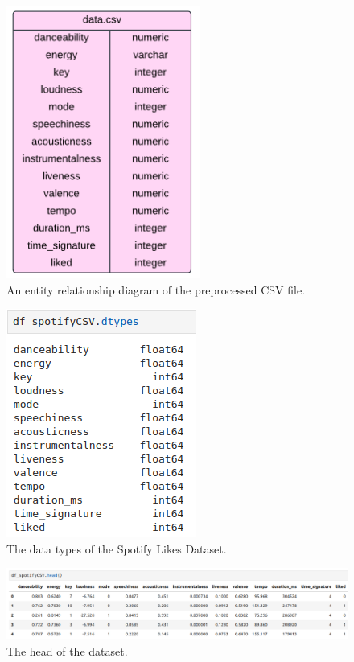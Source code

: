 \documentclass[12pt]{report}
\begin{document}
\begin{figure}[H]
    \centering
    \includegraphics[width=.5\linewidth]{Spotify-ERD.png}
    \caption{An entity relationship diagram of the preprocessed CSV file.}
    \label{fig:Spotify-ERD}
\end{figure}

\begin{figure}[H]
    \centering
    \includegraphics[width=.4\linewidth]{pandas/Spotify-DTypes.png}
    \caption{The data types of the Spotify Likes Dataset.}
    \label{fig:Spotify-DTypes}
\end{figure}

\begin{figure}[H]
    \centering
    \includegraphics[width=\linewidth]{pandas/Spotify-Head.png}
    \caption{The head of the dataset.}
    \label{fig:Spotify-Head}
\end{figure}
\end{document}
